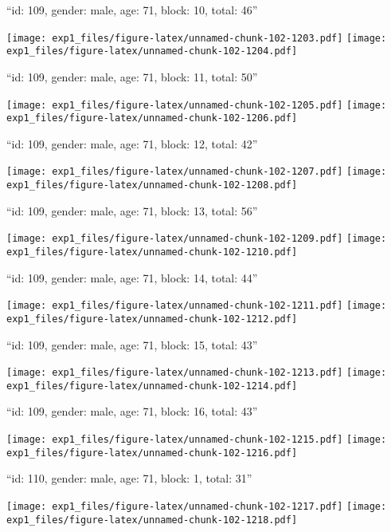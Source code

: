 \documentclass[11pt,,]{article}
\begin{document}
\newpage
[1] 

``id: 109, gender: male, age: 71, block: 10, total: 46''

\texttt{[image: exp1\_files/figure-latex/unnamed-chunk-102-1203.pdf]}
\texttt{[image: exp1\_files/figure-latex/unnamed-chunk-102-1204.pdf]}

\newpage
[1] 

``id: 109, gender: male, age: 71, block: 11, total: 50''

\texttt{[image: exp1\_files/figure-latex/unnamed-chunk-102-1205.pdf]}
\texttt{[image: exp1\_files/figure-latex/unnamed-chunk-102-1206.pdf]}

\newpage
[1] 

``id: 109, gender: male, age: 71, block: 12, total: 42''

\texttt{[image: exp1\_files/figure-latex/unnamed-chunk-102-1207.pdf]}
\texttt{[image: exp1\_files/figure-latex/unnamed-chunk-102-1208.pdf]}

\newpage
[1] 

``id: 109, gender: male, age: 71, block: 13, total: 56''

\texttt{[image: exp1\_files/figure-latex/unnamed-chunk-102-1209.pdf]}
\texttt{[image: exp1\_files/figure-latex/unnamed-chunk-102-1210.pdf]}

\newpage
[1] 

``id: 109, gender: male, age: 71, block: 14, total: 44''

\texttt{[image: exp1\_files/figure-latex/unnamed-chunk-102-1211.pdf]}
\texttt{[image: exp1\_files/figure-latex/unnamed-chunk-102-1212.pdf]}

\newpage
[1] 

``id: 109, gender: male, age: 71, block: 15, total: 43''

\texttt{[image: exp1\_files/figure-latex/unnamed-chunk-102-1213.pdf]}
\texttt{[image: exp1\_files/figure-latex/unnamed-chunk-102-1214.pdf]}

\newpage
[1] 

``id: 109, gender: male, age: 71, block: 16, total: 43''

\texttt{[image: exp1\_files/figure-latex/unnamed-chunk-102-1215.pdf]}
\texttt{[image: exp1\_files/figure-latex/unnamed-chunk-102-1216.pdf]}

\newpage
[1] 

``id: 110, gender: male, age: 71, block: 1, total: 31''

\texttt{[image: exp1\_files/figure-latex/unnamed-chunk-102-1217.pdf]}
\texttt{[image: exp1\_files/figure-latex/unnamed-chunk-102-1218.pdf]}
\end{document}
